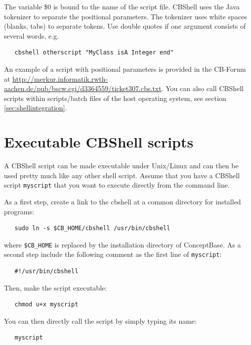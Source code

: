 The variable \$0 is bound to the name
of the script file. CBShell uses the Java tokenizer to separate the positional parameters.
The tokenizer uses white spaces (blanks, tabs) to separate tokens. Use double quotes
if one argument consists of several words, e.g. 

\begin{verbatim}
   cbshell otherscript "MyClass isA Integer end"
\end{verbatim}

An example of a script with positional parameters is provided in the CB-Forum at
\url{http://merkur.informatik.rwth-aachen.de/pub/bscw.cgi/d3364559/ticket307.cbs.txt}.
You can also call CBShell scripts within scripts/batch files of the host operating system,
see section \ref{sec:shellintegration}.


\section{Executable CBShell scripts}
\label{sec:execcbshell}

A CBShell script can be made executable under Unix/Linux and can then be used pretty much like any other
shell script. Assume that you have a CBShell script {\tt myscript} that you want to execute directly from
the command line.

As a first step, create a link to the cbshell at a common directory for installed programs:

\begin{verbatim}
   sudo ln -s $CB_HOME/cbshell /usr/bin/cbshell
\end{verbatim}

where {\tt \$CB\_HOME} is replaced by the installation directory of ConceptBase.
As a second step include the following comment as the first line of {\tt myscript}:

\begin{verbatim}
   #!/usr/bin/cbshell
\end{verbatim}

Then, make the script executable:

\begin{verbatim}
   chmod u+x myscript
\end{verbatim}

You can then directly call the script by simply typing its name:

\begin{verbatim}
   myscript
\end{verbatim}

